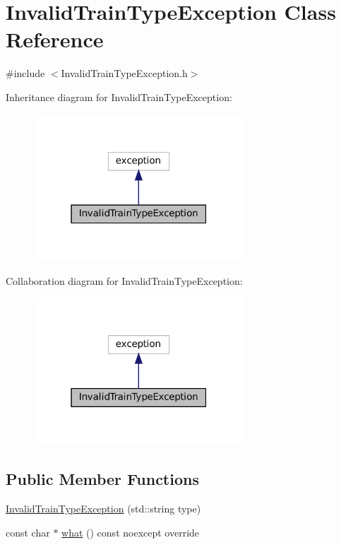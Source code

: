 \hypertarget{classInvalidTrainTypeException}{}\section{Invalid\+Train\+Type\+Exception Class Reference}
\label{classInvalidTrainTypeException}


{\ttfamily \#include $<$Invalid\+Train\+Type\+Exception.\+h$>$}



Inheritance diagram for Invalid\+Train\+Type\+Exception\+:
\nopagebreak
\begin{figure}[H]
\begin{center}
\leavevmode
\includegraphics[width=223pt]{classInvalidTrainTypeException__inherit__graph}
\end{center}
\end{figure}


Collaboration diagram for Invalid\+Train\+Type\+Exception\+:
\nopagebreak
\begin{figure}[H]
\begin{center}
\leavevmode
\includegraphics[width=223pt]{classInvalidTrainTypeException__coll__graph}
\end{center}
\end{figure}
\subsection*{Public Member Functions}
\begin{DoxyCompactItemize}
\item 
\mbox{\hyperlink{classInvalidTrainTypeException_aa06f57cd1c9c04bc98cece928a6f0ed8}{Invalid\+Train\+Type\+Exception}} (std\+::string type)
\item 
const char $\ast$ \mbox{\hyperlink{classInvalidTrainTypeException_a9eb95875231c7bace498e824f2e746c2}{what}} () const noexcept override
\end{DoxyCompactItemize}


